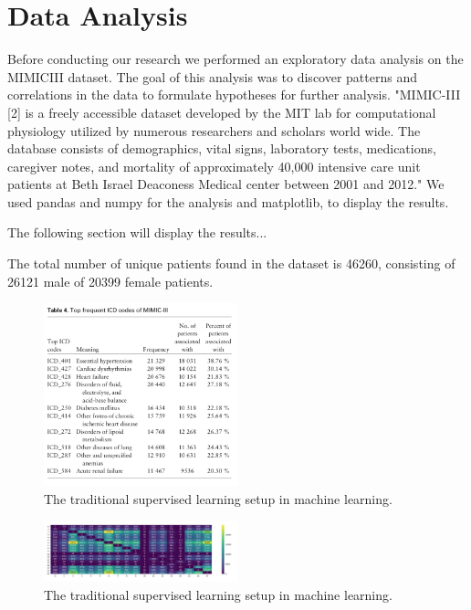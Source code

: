 \documentclass[11pt, a4paper]{book}
\begin{document}
\chapter{Data Analysis}
Before conducting our research we performed an exploratory data analysis on the MIMICIII dataset. The goal of this analysis was to discover patterns and correlations in the data to formulate hypotheses for further analysis. "MIMIC-III [2] is a freely accessible dataset developed by the MIT lab for computational physiology utilized by numerous researchers and scholars world wide. The database consists of demographics, vital signs, laboratory tests, medications, caregiver notes, and mortality of approximately 40,000 intensive care unit patients at Beth Israel Deaconess Medical center between 2001 and 2012." \citep{arya2019exploratory}
We used pandas and numpy for the analysis and matplotlib, to display the results.

The following section will display the results...

The total number of unique patients found in the dataset is 46260, consisting of 26121 male of 20399 female patients.

\begin{figure}
  \begin{center}
  \includegraphics[width=0.5\textwidth]{icd_top_frequency}
  \caption{The traditional supervised learning setup in machine learning. \citep{Ruder2019}}
  \label{fig:transfer_learning_no}
  \end{center}
\end{figure}

\begin{figure}
  \begin{center}
  \includegraphics[width=0.5\textwidth]{img/correlation-heatmap.png}
  \caption{The traditional supervised learning setup in machine learning. \citep{Ruder2019}}
  \label{fig:transfer_learning_no}
  \end{center}
\end{figure}
\end{document}
